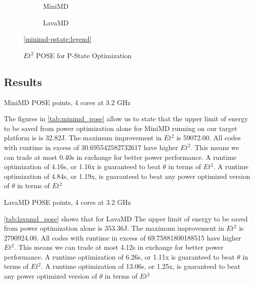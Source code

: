 \begin{figure}[t]%
\begin{subfigure}[t]{.5\linewidth}%
\centering%
%
\caption{MiniMD}%
\end{subfigure}%
\begin{subfigure}[t]{.5\linewidth}%
%
\caption{LavaMD}%
\end{subfigure}%
\begin{center}%
\ref{minimd-pstate:legend}%
\end{center}%
\caption{$Et^2$ POSE for P-State Optimization}%
\label{fig:pstates}%
\end{figure}%

\subsection{Results}

\begin{table}
\centering

\caption{MiniMD POSE points, 4 cores at 3.2 GHz}
\label{tab:minimd_pose}
\end{table} 



The figures in \autoref{tab:minimd_pose} allow us to state that the upper limit of energy to be saved from power optimization alone for MiniMD running on our target platform is is 32.82J.
The maximum improvement in $Et^2$ is 59072.00.
All codes with runtime in excess of 30.695542582732617 have higher $Et^2$.
This means we can trade at most 0.40s in exchange for better power performance.
A runtime optimization of 4.16s, or 1.16x is guaranteed to beat $\theta$ in terms of $Et^2$. 
A runtime optimization of 4.84s, or 1.19x, is guaranteed to beat any power optimized version of $\theta$ in terms of $Et^2$ 


\begin{table}
\centering

\caption{LavaMD POSE points, 4 cores at 3.2 GHz}
\label{tab:lavamd_pose}
\end{table} 

\autoref{tab:lavamd_pose} shows that for LavaMD The upper limit of energy to be saved from power optimization alone is 353.36J.
The maximum improvement in $Et^2$ is 2790924.00.
All codes with runtime in excess of 69.75881800188515 have higher $Et^2$.
This means we can trade at most 4.12s in exchange for better power performance.
A runtime optimization of 6.26s, or 1.11x is guaranteed to beat $\theta$ in terms of $Et^2$. 
A runtime optimization of 13.06s, or 1.25x, is guaranteed to beat any power optimized version of $\theta$ in terms of $Et^2$ 

